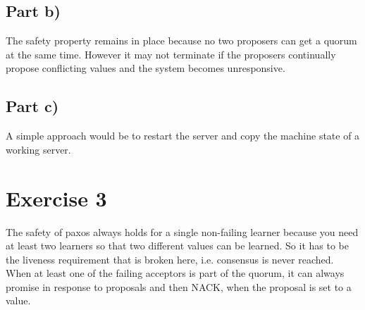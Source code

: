 \documentclass[10pt,a4paper]{article}
\begin{document}
\subsection*{Part b)}

The safety property remains in place because no two proposers can get a quorum at the same time.
However it may not terminate if the proposers continually propose conflicting values and the system becomes unresponsive.

\subsection*{Part c)}

A simple approach would be to restart the server and copy the machine state of a working server.

\section*{Exercise 3}

The safety of paxos always holds for a single non-failing learner because you need at least two learners so that two different values can be learned.
So it has to be the liveness requirement that is broken here, i.e. consensus is never reached.
When at least one of the failing acceptors is part of the quorum, it can always promise in response to proposals and then NACK, when the proposal is set to a value.
\end{document}
